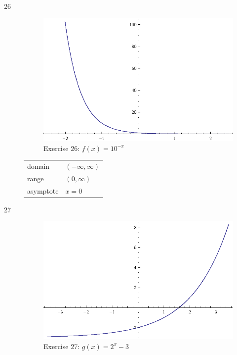 \documentclass{exam}
\begin{document}
\begin{description}
    \item[26] 
      \begin{figure}[H]
        \centering
        \includegraphics[scale=1.0]{exercise26.eps}
        \caption*{Exercise 26: $f(x) = 10^{-x}$}
      \end{figure}

      \begin{tabular}[H]{ll}
        \toprule
        domain    & $(-\infty, \infty)$ \\
        range     & $(0, \infty)$ \\
        asymptote & $x = 0$ \\
        \bottomrule
      \end{tabular}

    \item[27] 
      \begin{figure}[H]
        \centering
        \includegraphics[scale=1.0]{exercise27.eps}
        \caption*{Exercise 27: $g(x) = 2^x - 3$}
      \end{figure}


\end{description}
\end{document}
